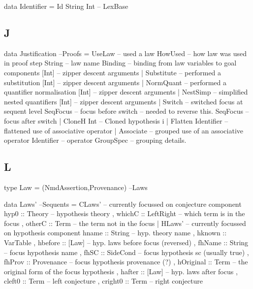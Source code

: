 \begin{code}
data Identifier = Id String Int                                    -- LexBase
\end{code}

\subsection{J}

\begin{code}
data Justification                                                    --Proofs
  = UseLaw             -- used a law
      HowUsed              -- how law was used in proof step
      String               -- law name
      Binding              -- binding from law variables to goal components
      [Int]                -- zipper descent arguments
  | Substitute         -- performed a substitution
      [Int]                -- zipper descent arguments
  | NormQuant          -- performed a quantifier normalisation
      [Int]                -- zipper descent arguments
  | NestSimp           -- simplified nested quantifiers
      [Int]                -- zipper descent arguments
  | Switch             -- switched focus at sequent level
      SeqFocus             -- focus before switch -- needed to reverse this.
      SeqFocus             -- focus after switch
  | CloneH Int         --  Cloned hypothesis i
  | Flatten Identifier -- flattened use of associative operator
  | Associate          -- grouped use of an associative operator
      Identifier           -- operator
      GroupSpec            -- grouping details.
\end{code}


\subsection{L}

\begin{code}
type Law = (NmdAssertion,Provenance)                                    --Laws
\end{code}

\begin{code}
data Laws'                                                          --Sequents
  = CLaws' { -- currently focussed on conjecture component
      hyp0  :: Theory -- hypothesis theory
    , whichC :: LeftRight -- which term is in the focus
    , otherC :: Term  -- the term not in the focus
    }
  | HLaws' { -- currently focussed on hypothesis component
      hname     :: String -- hyp. theory name
    , hknown    :: VarTable
    , hbefore   :: [Law] -- hyp. laws before focus (reversed)
    , fhName    :: String -- focus hypothesis name
    , fhSC      :: SideCond -- focus hypothesis sc (usually true)
    , fhProv    :: Provenance -- focus hypothesis provenance (?)
    , hOriginal :: Term -- the original form of the focus hypothesis
    , hafter    :: [Law] -- hyp. laws after focus
    , cleft0    :: Term -- left conjecture
    , cright0   :: Term -- right conjecture
    }
\end{code}


